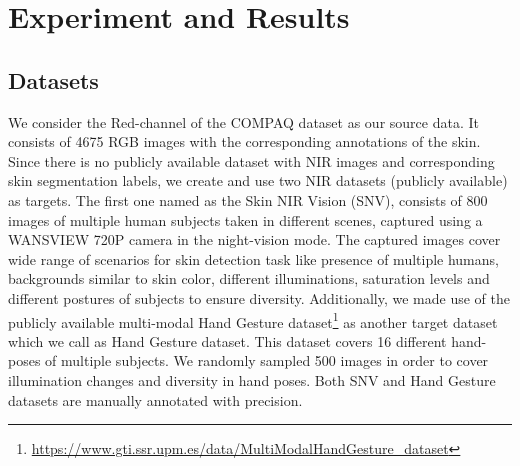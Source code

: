 \documentclass[runningheads]{llncs}
\begin{document}
\section{Experiment and Results}
\subsection{Datasets}
We consider the Red-channel of the COMPAQ dataset \cite{jones2002statistical} as our source data. It consists of 4675 RGB images with the corresponding annotations of the skin. 
Since there is no publicly available dataset with NIR images and corresponding skin segmentation labels, we create and use two NIR datasets (publicly available) as targets. The first one named as the Skin NIR Vision (SNV), consists of 800 images of multiple human subjects taken in different scenes, captured using a WANSVIEW 720P camera in the night-vision mode. The captured images cover wide range of scenarios for skin detection task like presence of multiple humans, backgrounds similar to skin color, different illuminations, saturation levels and different postures of subjects to ensure diversity.
Additionally, we made use of the publicly available multi-modal Hand Gesture dataset\footnote{\url{https://www.gti.ssr.upm.es/data/MultiModalHandGesture_dataset}} as another target dataset which we call as Hand Gesture dataset. This dataset covers 16 different hand-poses of multiple subjects. We randomly sampled  500 images in order to cover illumination changes and diversity in hand poses.
Both SNV and Hand Gesture datasets are manually annotated with precision. 
\end{document}
